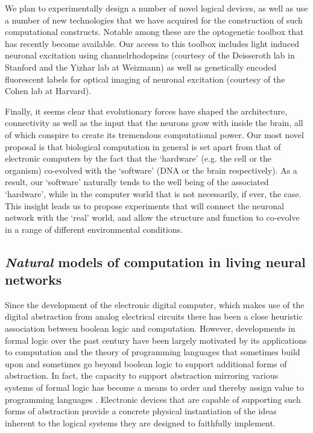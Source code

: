 We plan to experimentally design a number of novel logical devices, as well as use a number of new technologies that we have acquired for the construction of such computational constructs. Notable among these are the optogenetic toolbox that has recently become available. Our access to this toolbox includes light induced neuronal excitation using channelrhodopsins (courtesy of the Deisseroth lab in Stanford and the Yizhar lab at Weizmann) as well as genetically encoded fluorescent labels for optical imaging of neuronal excitation (courtesy of the Cohen lab at Harvard).

 Finally, it seems clear that evolutionary forces have shaped the architecture, connectivity as well as the input that the neurons grow with inside the brain, all of which conspire to create its tremendous computational power. Our most novel proposal is that  biological computation in general is set apart from that of electronic computers by the fact that the `hardware' (e.g. the cell or the organism) co-evolved with the `software' (DNA or the brain respectively). As a result, our `software' naturally tends to the well being of the associated `hardware', while in the computer world that is not necessarily, if ever, the case. This insight leads us to propose experiments that will connect the neuronal network with the `real' world, and  allow the structure and function to co-evolve in a range of different environmental conditions.

\subsection{\emph{Natural} models of computation in living neural networks}

Since the development of the electronic digital computer, which makes
use of the digital abstraction \cite{Ward1989} from analog electrical circuits
there has been a close heuristic association between boolean logic and
computation. However, developments in formal logic over the past century
have been largely motivated by its applications to computation and the
theory of programming languages that sometimes build upon and sometimes
go beyond boolean logic to support additional forms of abstraction. In
fact, the capacity to support abstraction mirroring various systems of
formal logic has become a means to order and thereby assign value to
programming languages \cite{Abelson1996}. Electronic devices that are capable
of supporting such forms of abstraction provide a concrete physical
instantiation of the ideas inherent to the logical systems they are
designed to faithfully implement.

